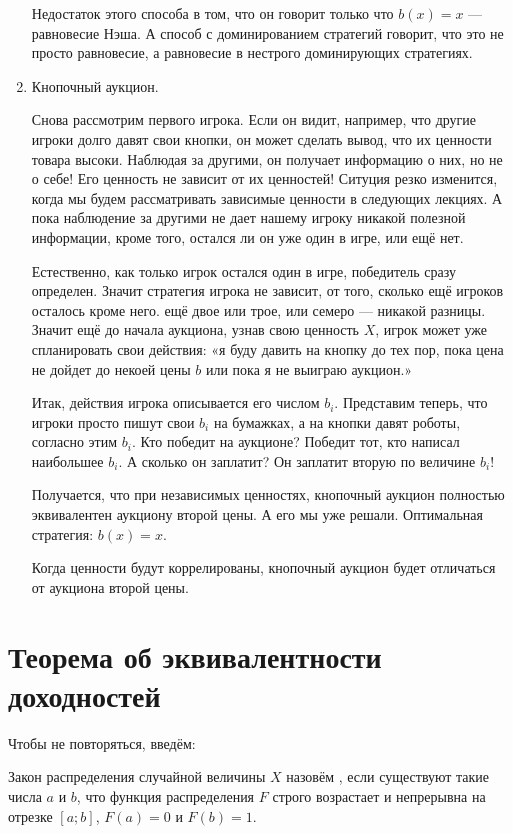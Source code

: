 \begin{enumerate}
\begin{myex}
Недостаток этого способа в том, что он говорит только что $ b(x)=x $ — равновесие Нэша. А способ с доминированием стратегий говорит, что это не просто равновесие, а равновесие в нестрого доминирующих стратегиях.
\end{myex}

\item Кнопочный аукцион.

Снова рассмотрим первого игрока. Если он видит, например, что другие игроки долго давят свои кнопки, он может сделать вывод, что их ценности товара высоки. Наблюдая за другими, он получает информацию о них, но не о себе! Его ценность не зависит от их ценностей! Ситуция резко изменится, когда мы будем рассматривать зависимые ценности в следующих лекциях. А пока наблюдение за другими не дает нашему игроку никакой полезной информации, кроме того, остался ли он уже один в игре, или ещё нет.

Естественно, как только игрок остался один в игре, победитель сразу определен. Значит стратегия игрока не зависит, от того, сколько ещё игроков осталось кроме него. ещё двое или трое, или семеро — никакой разницы. Значит ещё до начала аукциона, узнав свою ценность $ X $, игрок может уже спланировать свои действия: «я буду давить на кнопку до тех пор, пока цена не дойдет до некоей цены $ b $ или пока я не выиграю аукцион.»

Итак, действия игрока описывается его числом $ b_{i} $. Представим теперь, что игроки просто пишут свои $ b_{i} $ на бумажках, а на кнопки давят роботы, согласно этим $ b_{i} $. Кто победит на аукционе? Победит тот, кто написал наибольшее $ b_{i} $. А сколько он заплатит? Он заплатит вторую по величине $ b_{i} $!

Получается, что при независимых ценностях, кнопочный аукцион полностью эквивалентен аукциону второй цены. А его мы уже решали. Оптимальная стратегия: $ b(x)=x $.

Когда ценности будут коррелированы, кнопочный аукцион будет отличаться от аукциона второй цены.

\end{enumerate}


\section{Теорема об эквивалентности доходностей}

Чтобы не повторяться, введём:

\begin{mydef}
Закон распределения случайной величины $ X $ назовём , если существуют такие числа $a$ и $b$, что функция распределения $ F $ строго возрастает и непрерывна на отрезке $ [a;b] $, $ F(a)=0 $ и $ F(b)=1 $.
\end{mydef}


